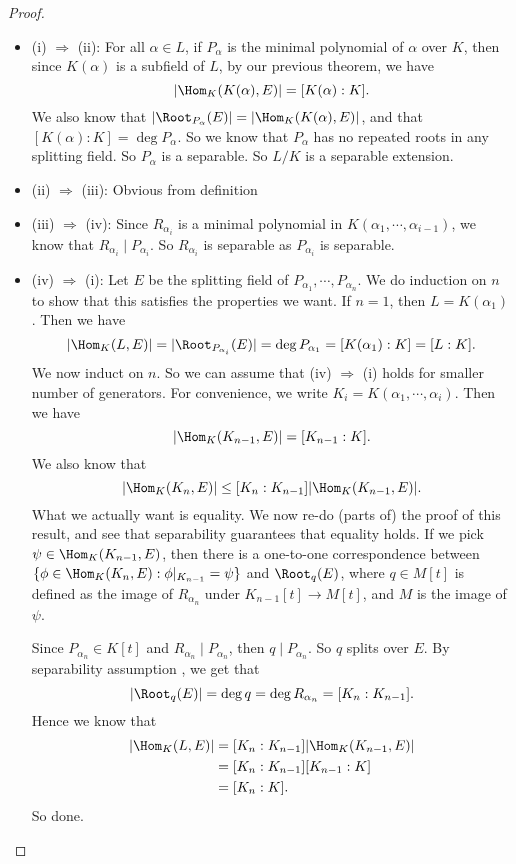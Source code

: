 \documentclass[a4paper]{article}
\begin{document}
\begin{proof}\leavevmode
  \begin{itemize}
    \item (i) $\Rightarrow$ (ii): For all $\alpha \in L$, if $P_\alpha$ is the minimal polynomial of $\alpha$ over $K$, then since $K(\alpha)$ is a subfield of $L$, by our previous theorem, we have
      \[
        |\Hom_K(K(\alpha), E)| = [K(\alpha): K].
      \]
      We also know that $|\Root_{P_\alpha}(E)| = |\Hom_K(K(\alpha), E)|$, and that $[K(\alpha): K] = \deg P_\alpha$. So we know that $P_\alpha$ has no repeated roots in any splitting field. So $P_\alpha$ is a separable. So $L/K$ is a separable extension.
    \item (ii) $\Rightarrow$ (iii): Obvious from definition
    \item (iii) $\Rightarrow$ (iv): Since $R_{\alpha_i}$ is a minimal polynomial in $K(\alpha_1, \cdots, \alpha_{i - 1})$, we know that $R_{\alpha_i} \mid P_{\alpha_i}$. So $R_{\alpha_i}$ is separable as $P_{\alpha_i}$ is separable.
    \item (iv) $\Rightarrow$ (i): Let $E$ be the splitting field of $P_{\alpha_1}, \cdots, P_{\alpha_n}$. We do induction on $n$ to show that this satisfies the properties we want. If $n = 1$, then $L = K(\alpha_1)$. Then we have
      \[
        |\Hom_K(L, E)| = |\Root_{P_{\alpha_i}}(E)| = \deg P_{\alpha_1} = [K(\alpha_1): K] = [L:K].
      \]
      We now induct on $n$. So we can assume that (iv) $\Rightarrow $ (i) holds for smaller number of generators. For convenience, we write $K_i = K(\alpha_1, \cdots, \alpha_i)$. Then we have
      \[
        |\Hom_K(K_{n - 1}, E)| = [K_{n - 1}: K].
      \]
      We also know that
      \[
        |\Hom_K(K_n, E)| \leq [K_n: K_{n - 1}] |\Hom_K(K_{n - 1}, E)|.
      \]
      What we actually want is equality. We now re-do (parts of) the proof of this result, and see that separability guarantees that equality holds. If we pick $\psi \in \Hom_K(K_{n - 1}, E)$, then there is a one-to-one correspondence between $\{\phi \in \Hom_K(K_n, E): \phi|_{K_{n - 1}} = \psi\}$ and $\Root_q(E)$, where $q \in M[t]$ is defined as the image of $R_{\alpha_n}$ under $K_{n - 1}[t] \to M[t]$, and $M$ is the image of $\psi$.

      Since $P_{\alpha_n} \in K[t]$ and $R_{\alpha_n} \mid P_{\alpha_n}$, then $q \mid P_{\alpha_n}$. So $q$ splits over $E$. By separability assumption , we get that
      \[
        |\Root_q(E)| = \deg q = \deg R_{\alpha_n} = [K_n: K_{n - 1}].
      \]
      Hence we know that
      \begin{align*}
        |\Hom_K(L, E)| &= [K_n: K_{n - 1}] | \Hom_K(K_{n - 1}, E)|\\
        &= [K_n: K_{n - 1}][K_{n - 1}: K]\\
        &= [K_n: K].
      \end{align*}
      So done.
  \end{itemize}
\end{proof}
\end{document}
